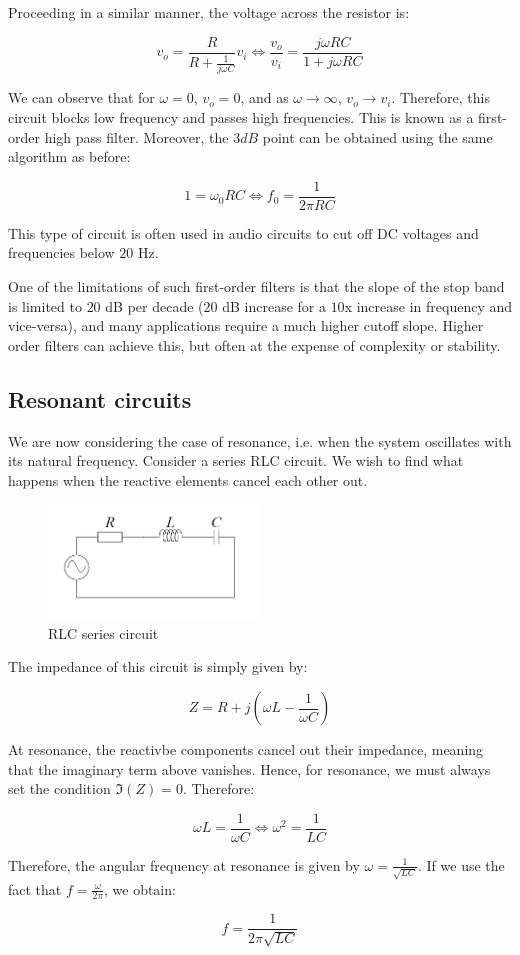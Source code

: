 \documentclass{article}
\begin{document}
Proceeding in a similar manner, the voltage across the resistor is:

\[ v_o = \frac{R}{R + \frac{1}{j\omega C}}v_i \iff \frac{v_o}{v_i} = \frac{j\omega RC}{1 + j\omega RC} \]

We can observe that for $\omega = 0$, $v_o = 0$, and as $\omega \to \infty$, $v_o \to v_i$. Therefore, this circuit blocks low frequency and passes high frequencies. This is known as a first-order high pass filter. Moreover, the $3dB$ point can be obtained using the same algorithm as before:

\[ 1 = \omega_0RC \iff f_0 = \frac{1}{2\pi RC} \]

This type of circuit is often used in audio circuits to cut off DC voltages and frequencies below $20$ Hz.

One of the limitations of such first-order filters is that the slope of the stop band is limited to $20$ dB per decade ($20$ dB increase for a $10$x increase in frequency and vice-versa), and many applications require a much higher cutoff slope. Higher order filters can achieve this, but often at the expense of complexity or stability.

\newpage

\subsection{Resonant circuits}

\begin{proposition}
We are now considering the case of resonance, i.e. when the system oscillates with its natural frequency. Consider a series RLC circuit. We wish to find what happens when the reactive elements cancel each other out.

\begin{figure}[h]
    \centering
    \includegraphics[width=0.5\textwidth]{images/rlc.png}
    \caption{RLC series circuit}
    \label{fig:rlc-series}
\end{figure}

The impedance of this circuit is simply given by:

\[ Z = R + j(\omega L - \frac{1}{\omega C}) \]

At resonance, the reactivbe components cancel out their impedance, meaning that the imaginary term above vanishes. Hence, for resonance, we must always set the condition $\Im(Z) = 0$. Therefore:

\[ \omega L = \frac{1}{\omega C} \iff \omega^2 = \frac{1}{LC} \]

Therefore, the angular frequency at resonance is given by $\omega = \frac{1}{\sqrt{LC}}$. If we use the fact that $f = \frac{\omega}{2\pi}$, we obtain:

\[ f = \frac{1}{2\pi\sqrt{LC}} \]

\end{proposition}
\end{document}
